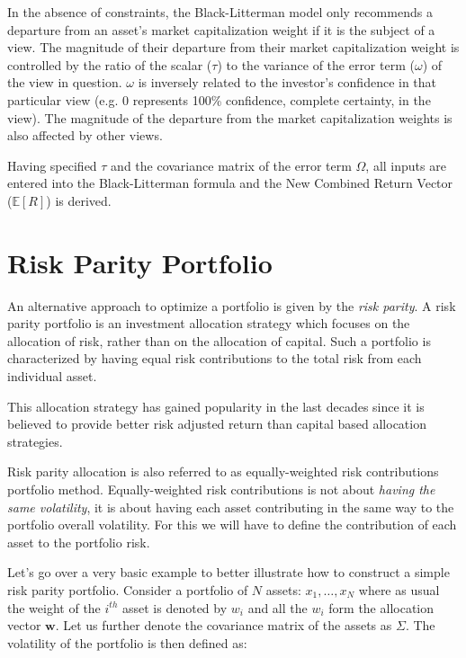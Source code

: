 In the absence of constraints, the Black-Litterman model only recommends a departure from an asset’s market capitalization weight if it is the subject of a view. The magnitude of their departure from their market capitalization weight is controlled by the ratio of the scalar ($\tau$) to the variance of the error term ($\omega$) of the view in question. $\omega$ is inversely related to the investor’s confidence in that particular view (e.g. 0 represents 100\% confidence, complete certainty, in the view). The magnitude of the departure from the market capitalization weights is also affected by other views. %

Having specified $\tau$ and the covariance matrix of the error term $\Omega$, all inputs are entered into the Black-Litterman formula and the New Combined Return Vector ($\mathbb{E}[R]$) is derived. 




\section{Risk Parity Portfolio}
\label{risk-parity-portfolio}

An alternative approach to optimize a portfolio is given by the \emph{risk parity}. A risk parity portfolio is an investment allocation strategy which focuses on the allocation of risk, rather than on the allocation of capital. 
Such a portfolio is characterized by having equal risk contributions to the total risk from each individual asset. 

This allocation strategy has gained popularity in the last decades since it is believed to provide better risk adjusted return than capital based allocation strategies.

Risk parity allocation is also referred to as equally-weighted risk contributions portfolio method. Equally-weighted risk contributions is not about \emph{having the same volatility}, it is about having each asset contributing in the same way to the portfolio overall volatility. For this we will have to define the contribution of each asset to the portfolio risk. 

Let's go over a very basic example to better illustrate how to construct a simple risk parity portfolio. Consider a portfolio of \(N\) assets: \(x_{1}, \ldots, x_N\) where as usual the weight of the $i^{th}$ asset is denoted by \(w_{i}\) and all the \(w_{i}\) form the allocation vector \(\mathbf{w}\). Let us further denote the covariance matrix of the assets as \(\Sigma\). The volatility of the portfolio is then defined as:

